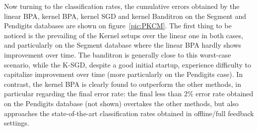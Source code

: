 \documentclass[preprint,12pt,authoryear]{elsarticle}
\begin{document}

	


Now turning to the classification rates, the cumulative errors obtained by the linear BPA, kernel BPA, kernel SGD and kernel Banditron on the Segment and Pendigits databases are shown on figure~\ref{pic:PKCM}. %
The first thing to be noticed is the prevailing of the Kernel setups over the linear one in both cases, and particularly on the Segment database where the linear BPA hardly shows improvement over time. 
 The banditron is generally close to this worst-case scenario, while the K-SGD, despite a good initial startup, experience difficulty to capitalize improvement over time (more particularly on the Pendigits case). In contrast, the kernel BPA is clearly found to outperform the other methods, in particular  regarding the final error rate: the final less than 2\% error rate obtained on the Pendigits database (not shown) overtakes the other methods, but also approaches the state-of-the-art classification rates obtained in offline/full feedback settings. 


\end{document}
